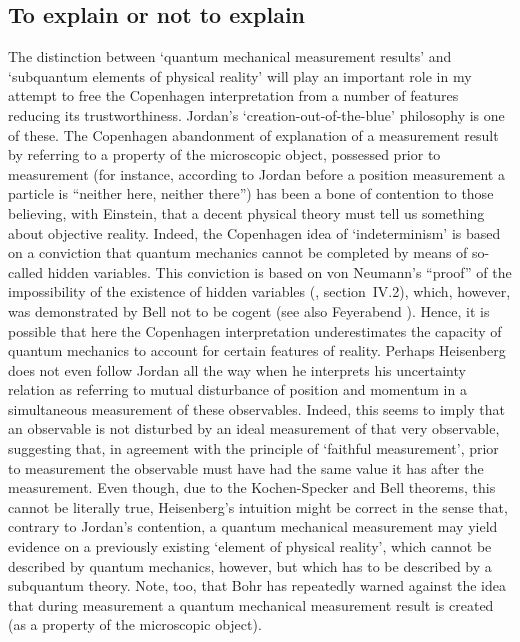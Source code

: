 \documentclass[12pt]{article}
\begin{document}
\subsection{To explain or not to explain}\label{sec2.1.3}
The distinction between `quantum mechanical measurement results'
and `subquantum elements of physical reality' will play an
important role in my attempt to free the Copenhagen interpretation
from a number of features reducing its trustworthiness. Jordan's
`creation-out-of-the-blue' philosophy is one of these. The
Copenhagen abandonment of explanation of a measurement result by
referring to a property of the microscopic object, possessed prior
to measurement (for instance, according to Jordan \cite{Jord34}
before a position measurement a particle is ``neither here,
neither there'') has been a bone of contention to those believing,
with Einstein, that a decent physical theory must tell us
something about objective reality. Indeed, the Copenhagen idea of
`indeterminism' is based on a conviction that quantum mechanics
cannot be completed by means of so-called hidden variables. This
conviction is based on von Neumann's ``proof'' of the
impossibility of the existence of hidden variables (\cite{vN32},
section~IV.2), which, however, was demonstrated by Bell
\cite{Bell66} not to be cogent (see also Feyerabend
\cite{Feyer56}). Hence, it is possible that here the Copenhagen
interpretation underestimates the capacity of quantum mechanics to account for certain features of reality.
Perhaps Heisenberg does
not even follow Jordan all the way when he interprets his
uncertainty relation as referring to mutual disturbance of
position and momentum in a simultaneous measurement of these
observables. Indeed, this seems to imply that an
observable is not disturbed by an ideal measurement of that very observable, suggesting that, in agreement with the principle of `faithful measurement', prior to measurement the observable must have had the same value it has after the measurement. Even though,
due to the Kochen-Specker and Bell theorems, this cannot be
literally true, Heisenberg's intuition might be correct in the
sense that, contrary to Jordan's contention, a quantum mechanical
measurement may yield evidence on a previously existing
`element of physical reality', which cannot be described by
quantum mechanics, however, but which has to be described by a
subquantum theory. Note, too, that Bohr has repeatedly warned
against the idea that during measurement a quantum mechanical
measurement result is created (as a property of the microscopic
object).
\end{document}
